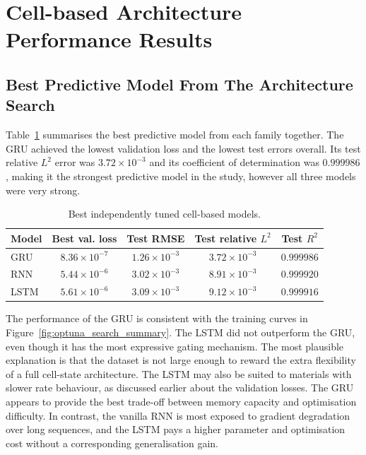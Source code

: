 \documentclass[11pt,a4paper, onecolumn]{article}
\begin{document}
\FloatBarrier
\section{Cell-based Architecture Performance Results}

\subsection{Best Predictive Model From The Architecture Search}

Table~\ref{tab:cell_model_comparison} summarises the best predictive model from each family together. The GRU achieved the lowest validation loss and the lowest test errors overall. Its test relative $L^2$ error was $3.72\times 10^{-3}$ and its coefficient of determination was $0.999986$, making it the strongest predictive model in the study, however all three models were very strong.


\begin{table}[h]
\centering
\caption{Best independently tuned cell-based models.}
\label{tab:cell_model_comparison}
\begin{tabular}{lcccc}
\toprule
Model & Best val. loss & Test RMSE & Test relative $L^2$ & Test $R^2$ \\
\midrule
GRU & $8.36\times 10^{-7}$ & $1.26\times 10^{-3}$ & $3.72\times 10^{-3}$ & $0.999986$ \\
RNN & $5.44\times 10^{-6}$ & $3.02\times 10^{-3}$ & $8.91\times 10^{-3}$ & $0.999920$ \\
LSTM & $5.61\times 10^{-6}$ & $3.09\times 10^{-3}$ & $9.12\times 10^{-3}$ & $0.999916$ \\
\bottomrule
\end{tabular}
\end{table}


The performance of the GRU is consistent with the training curves in Figure~\ref{fig:optuna_search_summary}. The LSTM did not outperform the GRU, even though it has the most expressive gating mechanism. The most plausible explanation is that the dataset is not large enough to reward the extra flexibility of a full cell-state architecture. The LSTM may also be suited to materials with slower rate behaviour, as discussed earlier about the validation losses. The GRU appears to provide the best trade-off between memory capacity and optimisation difficulty. In contrast, the vanilla RNN is most exposed to gradient degradation over long sequences, and the LSTM pays a higher parameter and optimisation cost without a corresponding generalisation gain.
\end{document}
